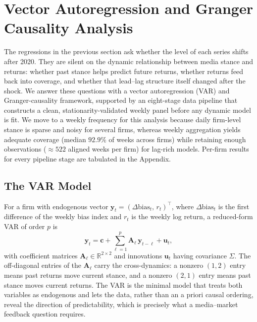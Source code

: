 \documentclass[conference]{IEEEtran}
\newcommand{\R}{\mathbb{R}}
\begin{document}
\section{Vector Autoregression and Granger Causality Analysis}
\label{sec:var}
The regressions in the previous section ask whether the level of each series
shifts after 2020. They are silent on the dynamic relationship between media
stance and returns: whether past stance helps predict future returns, whether
returns feed back into coverage, and whether that lead--lag structure itself
changed after the shock. We answer these questions with a vector autoregression
(VAR) and Granger-causality framework, supported by an eight-stage data
pipeline that constructs a clean, stationarity-validated weekly panel before any
dynamic model is fit. We move to a weekly frequency for this analysis because
daily firm-level stance is sparse and noisy for several firms, whereas weekly
aggregation yields adequate coverage (median $92.9\%$ of weeks across firms) while
retaining enough observations ($\approx 522$ aligned weeks per firm) for lag-rich
models. Per-firm results for every pipeline stage are tabulated in the Appendix.

\subsection{The VAR Model}
For a firm with endogenous vector $\mathbf{y}_t=(\Delta\text{bias}_t,\,r_t)^{\top}$,
where $\Delta\text{bias}_t$ is the first difference of the weekly bias index and
$r_t$ is the weekly log return, a reduced-form VAR of order $p$ is
\begin{equation}
\mathbf{y}_t = \mathbf{c} + \sum_{\ell=1}^{p}\mathbf{A}_\ell\,\mathbf{y}_{t-\ell}
+ \mathbf{u}_t,
\end{equation}
with coefficient matrices $\mathbf{A}_\ell\in\R^{2\times2}$ and innovations
$\mathbf{u}_t$ having covariance $\Sigma$. The off-diagonal entries of the
$\mathbf{A}_\ell$ carry the cross-dynamics: a nonzero $(1,2)$ entry means past
returns move current stance, and a nonzero $(2,1)$ entry means past stance moves
current returns. The VAR is the minimal model that treats both variables as
endogenous and lets the data, rather than an a priori causal ordering, reveal the
direction of predictability, which is precisely what a media--market feedback
question requires.
\end{document}
